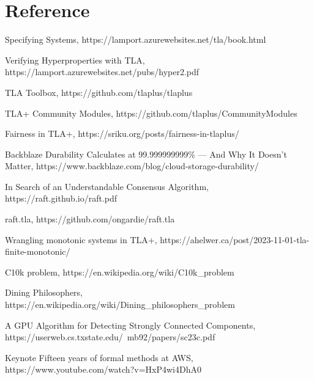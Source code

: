 \chapter{Reference}

\begin{thebibliography}{9}

Specifying Systems, 
https://lamport.azurewebsites.net/tla/book.html

Verifying Hyperproperties with TLA,
https://lamport.azurewebsites.net/pubs/hyper2.pdf

TLA Toolbox,
https://github.com/tlaplus/tlaplus

TLA+ Community Modules,
https://github.com/tlaplus/CommunityModules

\bibitem{}
Fairness in TLA+,
https://sriku.org/posts/fairness-in-tlaplus/

Backblaze Durability Calculates at 99.999999999\% — And Why It Doesn’t Matter,
https://www.backblaze.com/blog/cloud-storage-durability/

In Search of an Understandable Consensus Algorithm,
https://raft.github.io/raft.pdf

raft.tla,
https://github.com/ongardie/raft.tla

Wrangling monotonic systems in TLA+,
https://ahelwer.ca/post/2023-11-01-tla-finite-monotonic/

C10k problem,
https://en.wikipedia.org/wiki/C10k\_problem

Dining Philosophers,
https://en.wikipedia.org/wiki/Dining\_philosophers\_problem

A GPU Algorithm for Detecting Strongly Connected Components,
https://userweb.cs.txstate.edu/~mb92/papers/sc23c.pdf

\bibitem{}
Keynote Fifteen years of formal methods at AWS,
https://www.youtube.com/watch?v=HxP4wi4DhA0

\end{thebibliography}


